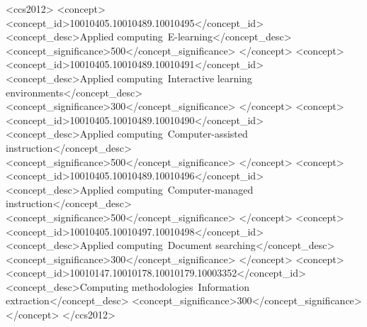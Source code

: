 \documentclass[sigconf,natbib=false]{acmart}
\begin{document}
\begin{CCSXML}
<ccs2012>
   <concept>
       <concept_id>10010405.10010489.10010495</concept_id>
       <concept_desc>Applied computing~E-learning</concept_desc>
       <concept_significance>500</concept_significance>
       </concept>
   <concept>
       <concept_id>10010405.10010489.10010491</concept_id>
       <concept_desc>Applied computing~Interactive learning environments</concept_desc>
       <concept_significance>300</concept_significance>
       </concept>
   <concept>
       <concept_id>10010405.10010489.10010490</concept_id>
       <concept_desc>Applied computing~Computer-assisted instruction</concept_desc>
       <concept_significance>500</concept_significance>
       </concept>
   <concept>
       <concept_id>10010405.10010489.10010496</concept_id>
       <concept_desc>Applied computing~Computer-managed instruction</concept_desc>
       <concept_significance>500</concept_significance>
       </concept>
   <concept>
       <concept_id>10010405.10010497.10010498</concept_id>
       <concept_desc>Applied computing~Document searching</concept_desc>
       <concept_significance>300</concept_significance>
       </concept>
   <concept>
       <concept_id>10010147.10010178.10010179.10003352</concept_id>
       <concept_desc>Computing methodologies~Information extraction</concept_desc>
       <concept_significance>300</concept_significance>
       </concept>
 </ccs2012>
\end{CCSXML}



\maketitle
\end{document}
